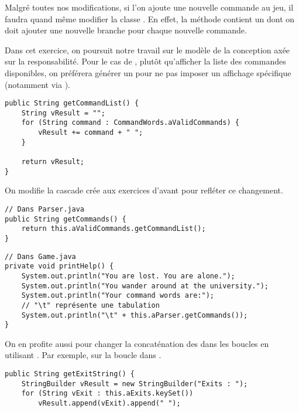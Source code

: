 \begin{exercise}[subtitle=Changer Game ?]

Malgré toutes nos modifications, si l'on ajoute une nouvelle commande au jeu, il faudra quand même modifier la classe . En effet, la méthode  contient un  dont on doit ajouter une nouvelle branche pour chaque nouvelle commande.

\end{exercise}

\begin{exercise}[subtitle=getCommandList]

Dans cet exercice, on poursuit notre travail sur le modèle de la conception axée sur la responsabilité. Pour le cas de , plutôt qu'afficher la liste des commandes disponibles, on préférera générer un  pour ne pas imposer un affichage spécifique (notamment via ).

\begin{verbatim}
public String getCommandList() {
    String vResult = "";
    for (String command : CommandWords.aValidCommands) {
        vResult += command + " ";
    }

    return vResult;
}
\end{verbatim}

On modifie la cascade crée aux exercices d'avant pour refléter ce changement.

\begin{verbatim}
// Dans Parser.java
public String getCommands() {
    return this.aValidCommands.getCommandList();
}
\end{verbatim}

\begin{verbatim}
// Dans Game.java
private void printHelp() {
    System.out.println("You are lost. You are alone.");
    System.out.println("You wander around at the university.");
    System.out.println("Your command words are:");
    // "\t" représente une tabulation
    System.out.println("\t" + this.aParser.getCommands());
}
\end{verbatim}

On en profite aussi pour changer la concaténation des  dans les boucles en utilisant . Par exemple, sur la boucle dans .

\begin{verbatim}
public String getExitString() {
    StringBuilder vResult = new StringBuilder("Exits : ");
    for (String vExit : this.aExits.keySet())
        vResult.append(vExit).append(" ");


\end{verbatim}
\end{exercise}
